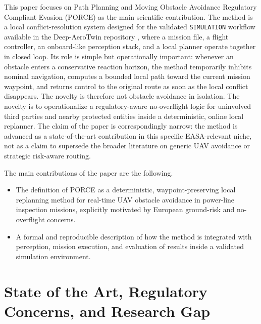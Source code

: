 \documentclass[journal,twoside,web]{ieeecolor}
\begin{document}
This paper focuses on Path Planning and Moving Obstacle Avoidance Regulatory Compliant Evasion (PORCE) as the main scientific contribution. The method is a local conflict-resolution system designed for the validated \texttt{SIMULATION} workflow available in the Deep-AeroTwin repository \cite{Deep_Aero_Twin}, where a mission file, a flight controller, an onboard-like perception stack, and a local planner operate together in closed loop. Its role is simple but operationally important: whenever an obstacle enters a conservative reaction horizon, the method temporarily inhibits nominal navigation, computes a bounded local path toward the current mission waypoint, and returns control to the original route as soon as the local conflict disappears. The novelty is therefore not obstacle avoidance in isolation. The novelty is to operationalize a regulatory-aware no-overflight logic for uninvolved third parties and nearby protected entities inside a deterministic, online local replanner. The claim of the paper is correspondingly narrow: the method is advanced as a state-of-the-art contribution in this specific EASA-relevant niche, not as a claim to supersede the broader literature on generic UAV avoidance or strategic risk-aware routing.

The main contributions of the paper are the following.
\begin{itemize}
    \item The definition of PORCE as a deterministic, waypoint-preserving local replanning method for real-time UAV obstacle avoidance in power-line inspection missions, explicitly motivated by European ground-risk and no-overflight concerns.
    \item A formal and reproducible description of how the method is integrated with perception, mission execution, and evaluation of results inside a validated simulation environment.
    

\end{itemize}


\section{State of the Art, Regulatory Concerns, and Research Gap}
\end{document}
